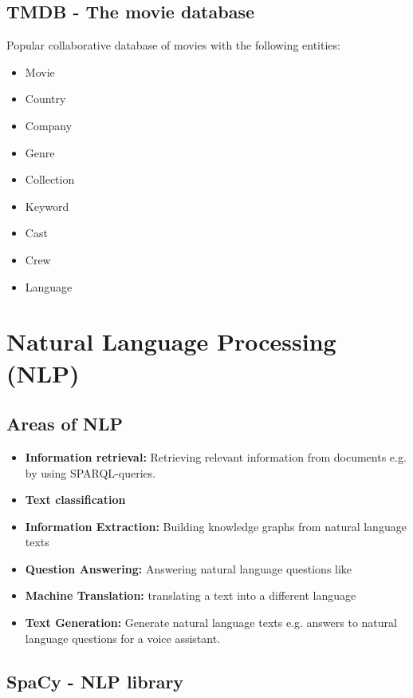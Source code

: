 \subsection{TMDB - The movie database}

Popular collaborative database of movies with the following entities:

\begin{itemize}
    \item Movie
    \item Country
    \item Company
    \item Genre
    \item Collection
    \item Keyword
    \item Cast
    \item Crew
    \item Language
\end{itemize}

\section{Natural Language Processing (NLP)}

\subsection{Areas of NLP}

\begin{itemize}
    \item \textbf{Information retrieval:} Retrieving relevant information from documents e.g. by using SPARQL-queries.
    \item \textbf{Text classification}
    \item \textbf{Information Extraction:} Building knowledge graphs from natural language texts
    \item \textbf{Question Answering:} Answering natural language questions like 
    \item \textbf{Machine Translation:} translating a text into a different language
    \item \textbf{Text Generation:} Generate natural language texts e.g. answers to natural language questions for a voice assistant.
\end{itemize}

\subsection{SpaCy - NLP library}

